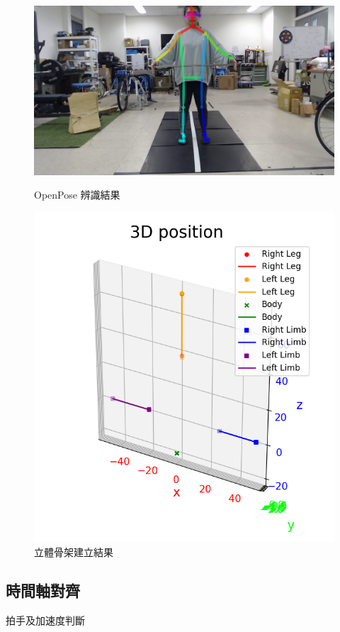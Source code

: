 \begin{figure}[!ht]
   \centering
   \begin{minipage}{.5\textwidth}
     \centering
     \includegraphics[width=.8\linewidth]{figure/ch3_fig_OpenPose_result.png}
     \caption[OpenPose 辨識結果]{OpenPose 辨識結果}
     \label{ch3_fig_OpenPose_result}
   \end{minipage}%
   \begin{minipage}{.5\textwidth}
     \centering
     \includegraphics[width=.8\linewidth]{figure/ch3_fig_my_skeleton.png}
     \caption[立體骨架建立結果]{立體骨架建立結果}
     \label{ch3_fig_my_skeleton}
   \end{minipage}
\end{figure}

\subsection{時間軸對齊}
拍手及加速度判斷

